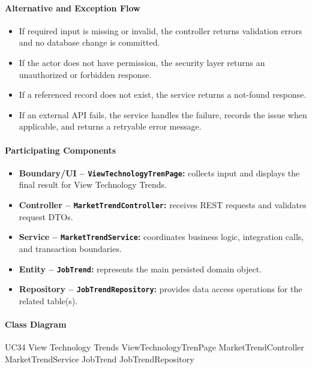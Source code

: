 \paragraph{Alternative and Exception Flow}

\begin{itemize}
    \item If required input is missing or invalid, the controller returns validation errors and no database change is committed.
    \item If the actor does not have permission, the security layer returns an unauthorized or forbidden response.
    \item If a referenced record does not exist, the service returns a not-found response.
    \item If an external API fails, the service handles the failure, records the issue when applicable, and returns a retryable error message.
\end{itemize}

\paragraph{Participating Components}

\begin{itemize}
    \item \textbf{Boundary/UI -- \texttt{ViewTechnologyTrenPage}:} collects input and displays the final result for View Technology Trends.
    \item \textbf{Controller -- \texttt{MarketTrendController}:} receives REST requests and validates request DTOs.
    \item \textbf{Service -- \texttt{MarketTrendService}:} coordinates business logic, integration calls, and transaction boundaries.
    \item \textbf{Entity -- \texttt{JobTrend}:} represents the main persisted domain object.
    \item \textbf{Repository -- \texttt{JobTrendRepository}:} provides data access operations for the related table(s).
\end{itemize}

\paragraph{Class Diagram}

\ClassDiagram
{UC34 View Technology Trends}
{ViewTechnologyTrenPage}
{MarketTrendController}
{MarketTrendService}
{JobTrend}
{JobTrendRepository}

